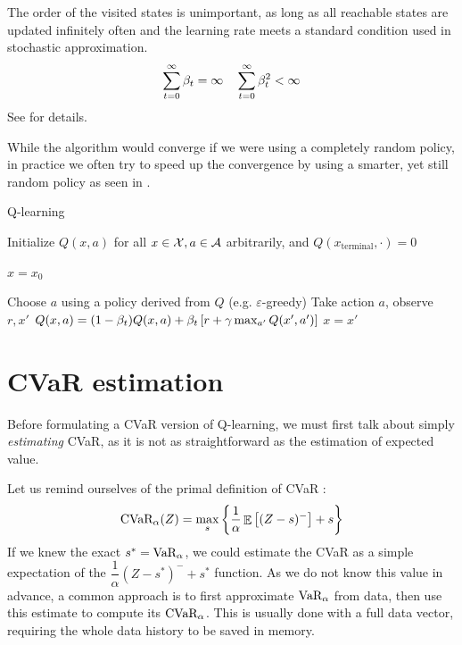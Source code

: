 The order of the visited states is unimportant, as long as all reachable states are updated infinitely often and the learning rate meets a standard condition used in stochastic approximation.
\begin{equation}\label{eqn:beta}
\sum_{t=0}^\infty \beta_t = \infty  \quad \sum_{t=0}^\infty \beta_t^2 < \infty\\
\end{equation}
See \citet{jaakkola1994convergence} for details.

While the algorithm would converge if we were using a completely random policy, in practice we often try to speed up the convergence by using a smarter, yet still random policy as seen in .


\begin{algorithm}
\caption{Q-learning}
\begin{algorithmic}\label{alg:qlearning}
    \STATE Initialize $Q(x, a)$ for all $x \in \mathcal{X}, a \in \mathcal{A}$ arbitrarily, and $Q(x_\text{terminal}, \cdot) = 0$
    
	
	\STATE $x = x_0$
	
	\STATE Choose $a$ using a policy derived from $Q$ (e.g. $\varepsilon$-greedy)
	\STATE Take action $a$, observe $r, x'$
	\STATE $Q(x, a) = (1-\beta_t)Q(x, a) + \beta_t\left[ {r + \gamma \max_{a'} Q(x', a')} \right]$
	\STATE $x = x'$	
	\ENDWHILE
	
	\ENDFOR
\end{algorithmic}
\end{algorithm}


\section{CVaR estimation}\label{sec:cvarestimation}

Before formulating a CVaR version of Q-learning, we must first talk about simply \emph{estimating} CVaR, as it is not as straightforward as the estimation of expected value.

Let us remind ourselves of the primal definition of CVaR :
\begin{equation*}
\text{CVaR}_\alpha(Z)=
\max_s\left\lbrace \dfrac{1}{\alpha}\mathop{\mathbb{E}}
\left[ (Z-s)^-\right] + s  \right\rbrace 
\end{equation*}
If we knew the exact $s^*=\text{VaR}_\alpha$, we could estimate the CVaR as a simple expectation of the $\dfrac{1}{\alpha}(Z-s^*)^-+s^*$ function. As we do not know this value in advance, a common approach is to first approximate $\text{VaR}_\alpha$ from data, then use this estimate to compute its $\text{CVaR}_\alpha$. This is usually done with a full data vector, requiring the whole data history to be saved in memory.

